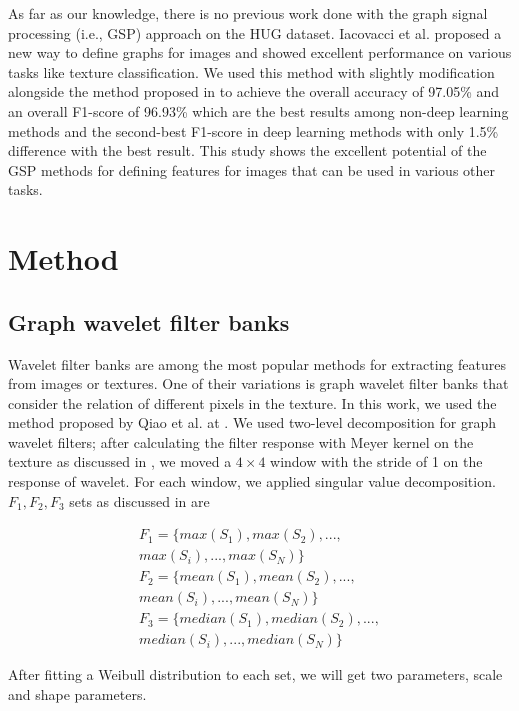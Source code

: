\documentclass[conference]{IEEEtran}
\begin{document}
As far as our knowledge, there is no previous work done with the graph signal processing (i.e., GSP) approach on the HUG dataset. Iacovacci et al. \cite{IVG} proposed a new way to define graphs for images and showed excellent performance on various tasks like texture classification. We used this method with slightly modification alongside the method proposed in \cite{wavelet} to achieve the overall accuracy of 97.05\% and an overall F1-score of 96.93\% which are the best results among non-deep learning methods and the second-best F1-score in deep learning methods with only 1.5\% difference with the best result. This study shows the excellent potential of the GSP methods for defining features for images that can be used in various other tasks.


\section{\large{Method}}
\subsection{\textbf{Graph wavelet filter banks}}

Wavelet filter banks are among the most popular methods for extracting features from images or textures. One of their variations is graph wavelet filter banks that consider the relation of different pixels in the texture. In this work, we used the method proposed by Qiao et al. at \cite{wavelet}. We used two-level decomposition for graph wavelet filters; after calculating the filter response with Meyer kernel on the texture as discussed in \cite{wavelet}, we moved a $4\times4$ window with the stride of 1 on the response of wavelet. For each window, we applied singular value decomposition. $F_1 , F_2, F_3$ sets as discussed in \cite{wavelet} are

\begin{equation}
\begin{multlined}
F_1=\{ max(S_1),max(S_2),...,\\max(S_i),...,max(S_N)\}\\
F_2=\{ mean(S_1),mean(S_2),...,\\mean(S_i),...,mean(S_N)\}\\
F_3=\{ median(S_1),median(S_2),...,\\median(S_i),...,median(S_N)\}
\end{multlined}
\end{equation}

After fitting a Weibull distribution to each set, we will get two parameters, scale and shape parameters.
\end{document}
